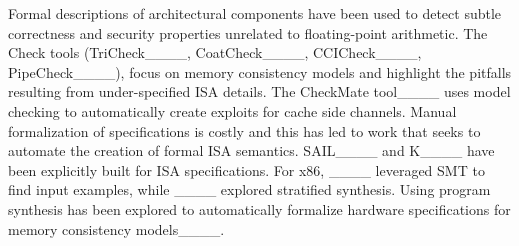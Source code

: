 Formal descriptions of architectural components have been used to detect subtle correctness and security properties unrelated to floating-point arithmetic.
The Check tools (TriCheck____, CoatCheck____, 
CCICheck____, 
PipeCheck____), focus on memory consistency models and highlight the pitfalls resulting from under-specified ISA details.
The CheckMate tool____ uses model checking to automatically create exploits for cache side channels.
Manual formalization of specifications is costly and this has led to work that seeks to automate the creation of formal ISA semantics. SAIL____ and K____ have been explicitly built for ISA specifications. For x86, ____ leveraged SMT to find input examples, while ____ explored stratified synthesis. Using program synthesis has been explored to automatically formalize hardware specifications for memory consistency models____.